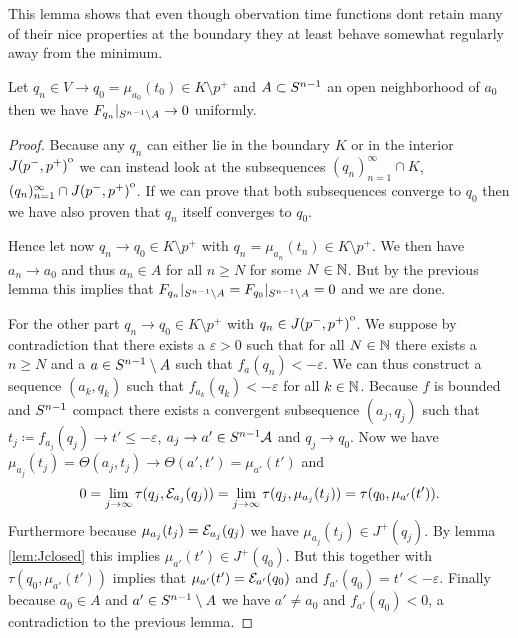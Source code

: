This lemma shows that even though obervation time functions dont retain many of their nice properties at the boundary they at least behave somewhat regularly away from the minimum.
\begin{lemma}\label{lem:convto1}
    Let $q_n\in V\to q_0=\mu_{a_0}(t_0)\in K\setminus{p^+}$ and $A\subset {S^{n-1}}$ an open neighborhood of $a_0$ then we have $F_{q_n}\rvert_{{S^{n-1}}\setminus A} \to 0$ uniformly.
\end{lemma}
\begin{proof}
    Because any $q_n$ can either lie in the boundary $K$ or in the interior ${\kern0ptJ(p^-,p^+)}^{\mathrm{o}}$ we can instead look at the subsequences $(q_n)_{n=1}^\infty \cap K$, $(q_n)_{n=1}^\infty \cap {\kern0ptJ(p^-,p^+)}^{\mathrm{o}}$. If we can prove that both subsequences converge to $q_0$ then we have also proven that $q_n$ itself converges to $q_0$. 

    Hence let now $q_n \to q_0\in K\setminus p^+$ with $q_n=\mu_{a_n}(t_n) \in K\setminus p^+$. We then have $a_n\to a_0$ and thus $a_n \in A$ for all $n\ge N$ for some $N\in \mathbb{N}$. But by the previous lemma this implies that $F_{q_n}\rvert_{{S^{n-1}}\setminus A} = F_{q_0}\rvert_{{S^{n-1}}\setminus A} = 0$ and we are done.

    For the other part $q_n \to q_0\in K\setminus p^+$ with $q_n \in {\kern0ptJ(p^-,p^+)}^{\mathrm{o}}$.
    We suppose by contradiction that there exists a $\varepsilon>0$ such that for all $N\in \mathbb{N}$ there exists a $n\ge N$ and a $a\in {S^{n-1}}\setminus A$ such that $f_a(q_n)<-\varepsilon$. We can thus construct a sequence $(a_k, q_k)$ such that $f_{a_k}(q_k)<-\varepsilon$ for all $k\in \mathbb{N}$. Because $f$ is bounded and ${S^{n-1}}$ compact there exists a convergent subsequence $(a_j,q_j)$ such that $t_j\coloneqq f_{a_j}(q_j)\to t'\leq -\varepsilon$, $a_j \to a'\in {S^{n-1}}\mathcal{A}$ and $q_j\to q_0$. Now we have $\mu_{a_j}(t_j) = \Theta(a_j,t_j) \to \Theta(a',t')=\mu_{a'}(t')$ and 
    \[
        0 = \lim_{j\to \infty}\tau(q_j,{\mathcal{E}}_{a_j}(q_j)) = \lim_{j\to \infty}\tau(q_j,\mu_{a_j}(t_j)) = \tau(q_0,\mu_{a'}(t')).
    \]
    Furthermore because $\mu_{a_j}(t_j)={\mathcal{E}}_{a_j}(q_j)$ we have $\mu_{a_j}(t_j)\in J^+(q_j)$. By lemma \ref{lem:Jclosed} this implies $\mu_{a'}(t')\in J^+(q_0)$. But this together with $\tau(q_0,\mu_{a'}(t'))$ implies that $\mu_{a'}(t')={\mathcal{E}}_{a'}(q_0)$ and $f_{a'}(q_0)=t'<-\varepsilon$. Finally because $a_0\in A$ and $a'\in {S^{n-1}}\setminus A$ we have $a'\neq a_0$ and $f_{a'}(q_0) <  0$, a contradiction to the previous lemma.
\end{proof}

